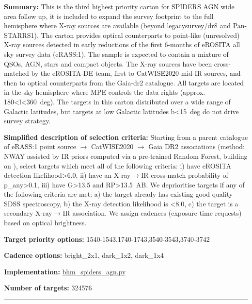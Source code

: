 \noindent\textbf{Summary:} This is the third highest priority carton for SPIDERS
AGN wide area follow up, it is included to expand the survey footprint
to the full hemisphere where X-ray sources are available (beyond
legacysurvey/dr8 and Pan-STARRS1). The carton provides optical
counterparts to point-like (unresolved) X-ray sources detected in early
reductions of the first 6-months of eROSITA all sky survey data
(eRASS:1). The sample is expected to contain a mixture of QSOs, AGN,
stars and compact objects. The X-ray sources have been cross-matched by
the eROSITA-DE team, first to
CatWISE2020 \citep{Marocco2021}
mid-IR sources, and then to optical counterparts from the Gaia-dr2
catalogue. All targets are located in the sky hemisphere where MPE
controls the data rights (approx. 180\textless{}l\textless{}360~deg).
The targets in this carton distributed over a wide range of Galactic
latitudes, but targets at low Galactic latitudes
\textbar{}b\textbar{}\textless{}15~deg do not drive survey strategy.

\noindent\textbf{Simplified description of selection criteria:} Starting from a
parent catalogue of eRASS:1 point source $\rightarrow$ CatWISE2020 $\rightarrow$ Gaia DR2
associations (method: NWAY assisted by IR priors computed via a
pre-trained Random Forest, building on
\citealt{Salvato2022}), select targets which meet all of the following criteria:
i) have eROSITA detection likelihood\textgreater{}6.0, ii) have an
X-ray$\rightarrow$IR cross-match probability of p\_any\textgreater{}0.1, iii) have
G\textgreater{}13.5 and RP\textgreater{}13.5~AB. We deprioritise targets
if any of the following criteria are met: a) the target already has
existing good quality SDSS spectroscopy, b) the X-ray detection
likelihood is \textless{}8.0, c) the target is a secondary X-ray$\rightarrow$IR
association. We assign cadences (exposure time requests) based on
optical brightness.


\noindent\textbf{Target priority options:}
1540-1543,1740-1743,3540-3543,3740-3742

\noindent\textbf{Cadence options:} bright\_2x1, dark\_1x2, dark\_1x4

\noindent\textbf{Implementation:}
\href{https://github.com/sdss/target_selection/blob/0.3.0/python/target_selection/cartons/bhm_spiders_agn.py}{bhm\_spiders\_agn.py}

\noindent\textbf{Number of targets:} 324576

\begin{center}\rule{0.5\linewidth}{0.5pt}\end{center}

